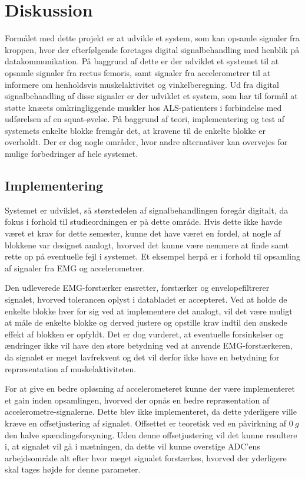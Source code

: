 \section{Diskussion}
Formålet med dette projekt er at udvikle et system, som kan opsamle signaler fra kroppen, hvor der efterfølgende foretages digital signalbehandling med henblik på datakommunikation. På baggrund af dette er der udviklet et systemet til at opsamle signaler fra rectus femoris, samt signaler fra accelerometrer til at informere om henholdsvis muskelaktivitet og vinkelberegning. Ud fra digital signalbehandling af disse signaler er der udviklet et system, som har til formål at støtte knæets omkringliggende muskler hos ALS-patienters i forbindelse med udførelsen af en squat-øvelse. På baggrund af teori, implementering og test af systemets enkelte blokke fremgår det, at kravene til de enkelte blokke er overholdt. Der er dog nogle områder, hvor andre alternativer kan overvejes for mulige forbedringer af hele systemet. 

\subsection{Implementering}
Systemet er udviklet, så størstedelen af signalbehandlingen foregår digitalt, da fokus i forhold til studieordningen er på dette område. Hvis dette ikke havde været et krav for dette semester, kunne det have været en fordel, at nogle af blokkene var designet analogt, hvorved det kunne være nemmere at finde samt rette op på eventuelle fejl i systemet. Et eksempel herpå er i forhold til opsamling af signaler fra EMG og accelerometrer. 

Den udleverede EMG-forstærker ensretter, forstærker og envelopefiltrerer signalet, hvorved tolerancen oplyst i databladet er accepteret. Ved at holde de enkelte blokke hver for sig ved at implementere det analogt, vil det være muligt at måle de enkelte blokke og derved justere og opstille krav indtil den ønskede effekt af blokken er opfyldt. Det er dog vurderet, at eventuelle forsinkelser og ændringer ikke vil have den store betydning ved at anvende EMG-forstærkeren, da signalet er meget lavfrekvent og det vil derfor ikke have en betydning for repræsentation af muskelaktiviteten. 

For at give en bedre opløsning af accelerometeret kunne der være implementeret et gain inden opsamlingen, hvorved der opnås en bedre repræsentation af accelerometre-signalerne. Dette blev ikke implementeret, da dette yderligere ville kræve en offsetjustering af signalet. Offsettet er teoretisk ved en påvirkning af $0~g$ den halve spændingsforsyning. Uden denne offsetjustering vil det kunne resultere i, at signalet vil gå i mætningen, da dette vil kunne overstige ADC'ens arbejdsområde alt efter hvor meget signalet forstærkes, hvorved der yderligere skal tages højde for denne parameter.

